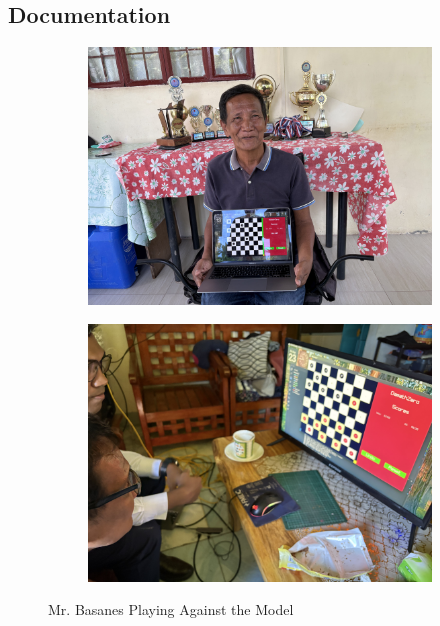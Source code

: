 \begin{appendices}

\chapter{Documentation}

\begin{figure}[H]
    \centering
    \begin{subfigure}{0.4\textwidth}
        \centering
        \includegraphics[width=\linewidth]{images/docs/IMG_1486.jpg}
    \end{subfigure}
    \quad
    \begin{subfigure}{0.4\textwidth}
        \centering
        \includegraphics[width=\linewidth]{images/docs/IMG_1550.jpg}
    \end{subfigure}
    \caption{Mr. Basanes Playing Against the Model}
\end{figure}


\end{appendices}

